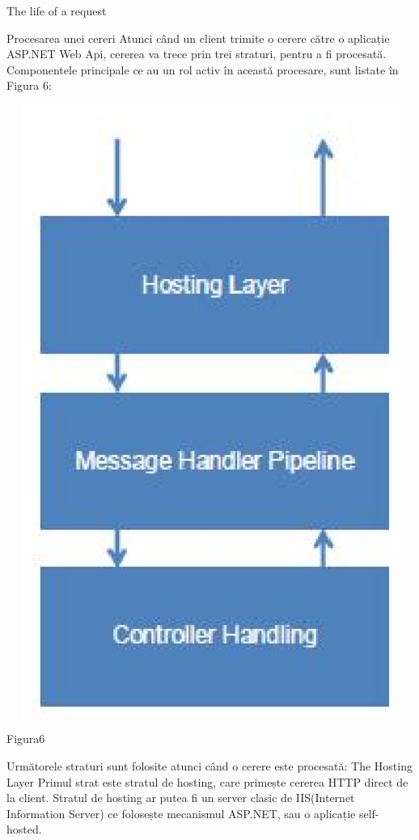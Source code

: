 The life of a request

Procesarea unei cereri
Atunci când un client trimite o cerere către o aplicație ASP.NET Web Api, cererea va trece prin trei straturi, pentru a fi procesată. Componentele principale ce au un rol activ în această procesare, sunt listate în Figura 6:
\begin{center}
\includegraphics[width=15cm,height=20cm]{imagini/cerere.eps} 
\caption{Figura6}
\end{center}
Următorele straturi sunt folosite atunci când o cerere este procesată:
The Hosting Layer
Primul strat este stratul de hosting, care primește cererea HTTP direct de la client. Stratul de hosting ar putea fi un server clasic de IIS(Internet Information Server) ce folosește mecanismul ASP.NET, sau o aplicație self-hosted.
